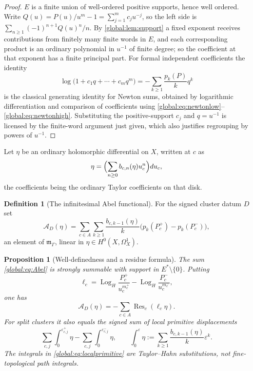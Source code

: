 \documentclass[11pt,letterpaper]{article}
\newtheorem{proposition}[proposition]{Proposition}
\theoremstyle{definition}
\newtheorem{definition}[definition]{Definition}
\theoremstyle{remark}
\newcommand{\mK}{\mathfrak m_\Gamma}
\newcommand{\LogH}{\operatorname{Log}_{H}}
\newcommand{\Res}{\operatorname{Res}}
\numberwithin{equation}{section}
\begin{document}
\begin{proof}
$E$ is a finite union of well-ordered positive supports, hence well ordered. Write $Q(u)=P(u)/u^m-1=\sum_{j=1}^mc_ju^{-j}$, so the left side is $\sum_{n\ge1}(-1)^{n+1}Q(u)^n/n$. By \cref{global:lem:support} a fixed exponent receives contributions from finitely many finite words in $E$, and each corresponding product is an ordinary polynomial in $u^{-1}$ of finite degree; so the coefficient at that exponent has a finite principal part. For formal independent coefficients the identity
\[
  \log\bigl(1+c_1q+\cdots+c_mq^m\bigr)=-\sum_{k\ge1}\frac{p_k(P)}{k}q^k
\]
is the classical generating identity for Newton sums, obtained by logarithmic differentiation and comparison of coefficients using \eqref{global:eq:newtonlow}--\eqref{global:eq:newtonhigh}. Substituting the positive-support $c_j$ and $q=u^{-1}$ is licensed by the finite-word argument just given, which also justifies regrouping by powers of $u^{-1}$.
\end{proof}

Let $\eta$ be an ordinary holomorphic differential on $X$, written at $c$ as
\begin{equation}\label{global:eq:differential}
  \eta=\Bigl(\sum_{n\ge0}b_{c,n}(\eta)u_c^n\Bigr)du_c,
\end{equation}
the coefficients being the ordinary Taylor coefficients on that disk.

\begin{definition}[The infinitesimal Abel functional]\label{global:def:abel}
For the signed cluster datum $D$ set
\begin{equation}\label{global:eq:Abel}
  \mathcal A_D(\eta)=\sum_{c\in A}\sum_{k\ge1}
  \frac{b_{c,k-1}(\eta)}{k}\bigl(p_k(P_c^+)-p_k(P_c^-)\bigr),
\end{equation}
an element of $\mK$, linear in $\eta\in H^0(X,\Omega^1_X)$.
\end{definition}

\begin{proposition}[Well-definedness and a residue formula]\label{global:prop:abelresidue}
The sum \eqref{global:eq:Abel} is strongly summable with support in $E^*\setminus\{0\}$. Putting
\[
  \ell_c=\LogH\frac{P_c^+}{u_c^{m_c^+}}-\LogH\frac{P_c^-}{u_c^{m_c^-}},
\]
one has
\begin{equation}\label{global:eq:Abelresidue}
  \mathcal A_D(\eta)=-\sum_{c\in A}\Res_c(\ell_c\eta).
\end{equation}
For split clusters it also equals the signed sum of local primitive displacements
\begin{equation}\label{global:eq:localprimitive}
  \sum_{c,j}\int_0^{\varepsilon^+_{c,j}}\eta-\sum_{c,j}\int_0^{\varepsilon^-_{c,j}}\eta,
  \qquad
  \int_0^\varepsilon\eta:=\sum_{k\ge1}\frac{b_{c,k-1}(\eta)}{k}\varepsilon^k .
\end{equation}
\emph{The integrals in \eqref{global:eq:localprimitive} are Taylor--Hahn substitutions, not fine-topological path integrals.}
\end{proposition}
\end{document}
